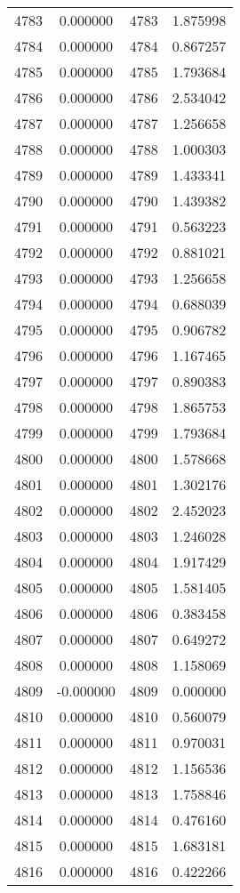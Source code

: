 \documentclass[12pt]{article}
\begin{document}
\begin{longtable}{@{}cccc@{}}
4783 & 0.000000 & 4783 & 1.875998 \\
4784 & 0.000000 & 4784 & 0.867257 \\
4785 & 0.000000 & 4785 & 1.793684 \\
4786 & 0.000000 & 4786 & 2.534042 \\
4787 & 0.000000 & 4787 & 1.256658 \\
4788 & 0.000000 & 4788 & 1.000303 \\
4789 & 0.000000 & 4789 & 1.433341 \\
4790 & 0.000000 & 4790 & 1.439382 \\
4791 & 0.000000 & 4791 & 0.563223 \\
4792 & 0.000000 & 4792 & 0.881021 \\
4793 & 0.000000 & 4793 & 1.256658 \\
4794 & 0.000000 & 4794 & 0.688039 \\
4795 & 0.000000 & 4795 & 0.906782 \\
4796 & 0.000000 & 4796 & 1.167465 \\
4797 & 0.000000 & 4797 & 0.890383 \\
4798 & 0.000000 & 4798 & 1.865753 \\
4799 & 0.000000 & 4799 & 1.793684 \\
4800 & 0.000000 & 4800 & 1.578668 \\
4801 & 0.000000 & 4801 & 1.302176 \\
4802 & 0.000000 & 4802 & 2.452023 \\
4803 & 0.000000 & 4803 & 1.246028 \\
4804 & 0.000000 & 4804 & 1.917429 \\
4805 & 0.000000 & 4805 & 1.581405 \\
4806 & 0.000000 & 4806 & 0.383458 \\
4807 & 0.000000 & 4807 & 0.649272 \\
4808 & 0.000000 & 4808 & 1.158069 \\
4809 & -0.000000 & 4809 & 0.000000 \\
4810 & 0.000000 & 4810 & 0.560079 \\
4811 & 0.000000 & 4811 & 0.970031 \\
4812 & 0.000000 & 4812 & 1.156536 \\
4813 & 0.000000 & 4813 & 1.758846 \\
4814 & 0.000000 & 4814 & 0.476160 \\
4815 & 0.000000 & 4815 & 1.683181 \\
4816 & 0.000000 & 4816 & 0.422266 \\

\end{longtable}
\end{document}
